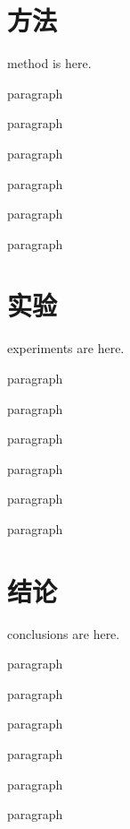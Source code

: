 \documentclass[twocolumn]{ctexart}
\begin{document}
	\section{方法}

	method is here.

	paragraph

	paragraph

	paragraph

	paragraph

	paragraph

	paragraph

	\section{实验}

	experiments are here.

	paragraph

	paragraph

	paragraph

	paragraph

	paragraph

	paragraph

	\section{结论}

	conclusions are here.

	paragraph

	paragraph

	paragraph

	paragraph

	paragraph

	paragraph
	
	
\end{document}
